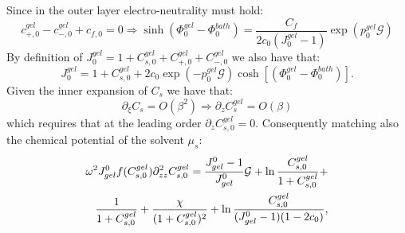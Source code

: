\documentclass[12pt]{extarticle}
\begin{document}
Since in the outer layer electro-neutrality must hold:
\begin{equation}
c^{gel}_{+,0}-c^{gel}_{-,0}+c_{f,0} =0 \Rightarrow  \sinh(\Phi_0^{gel}-\Phi_0^{bath})= \frac{C_f}{2c_0 (J_0^{gel}-1)}\exp(p_0^{gel}\mathcal{G})\label{eq2}
\end{equation}
By definition of $J^{gel}_0=1+C^{gel}_{s,0}+C^{gel}_{+,0}+C^{gel}_{-,0}$ we also have that:
\begin{equation}
J^{gel}_0=1+C^{gel}_{s,0}+ 2c_0\exp(-p_0^{gel}\mathcal{G})\cosh[(\Phi^{gel}_0-\Phi_0^{bath})]\label{eq3}.
\end{equation}
Given the inner expansion of $C_s$ we have that:
\begin{equation}
\partial_\xi C_s = O(\beta^2) \Rightarrow \partial_z C^{gel}_{s} = O(\beta)
\end{equation}
which requires that at the leading order $\partial_z C^{gel}_{s,0} = 0$.
Consequently matching also the chemical potential of the solvent $\mu_s$:
\begin{equation}
\begin{aligned}
\omega^2 J^0_{gel} f(C^{gel}_{s,0})\partial_{zz}^2 C^{gel}_{s,0}= \frac{J^0_{gel}-1}{J^0_{gel}} \mathcal{G}  + \ln \frac{C^{gel}_{s,0}}{1+C^{gel}_{s,0}} +\\ \frac{1}{1+C^{gel}_{s,0}}+\frac{\chi}{(1+C^{gel}_{s,0})^2} + \ln \frac{C^{gel}_{s,0}}{(J^0_{gel}-1)(1-2c_0)}, 
\end{aligned}\\[2.5mm]\label{eq4}
\end{equation}
\end{document}
